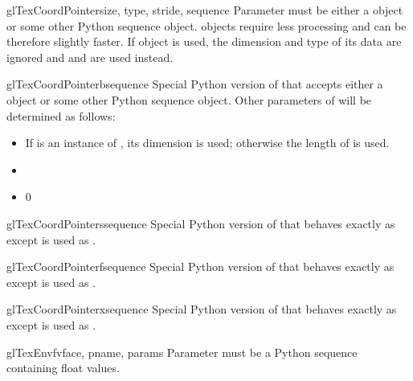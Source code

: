 \begin{funcdesc}{glTexCoordPointer}{size, type, stride, sequence}
Parameter  must be either a  object or some other
Python sequence object.  objects require less processing and
can be therefore slightly faster. If  object is used, the
dimension and type of its data are ignored and  and  are
used instead.
\end{funcdesc}

\begin{funcdesc}{glTexCoordPointerb}{sequence}
Special Python version of  that accepts either a
 object or some other Python sequence object. Other parameters
 of  will be determined as follows:
\begin{itemize}
\item {} If  is an instance of , its dimension is used; otherwise the length of  is used.
\item {} 
\item {} 0
\end{itemize}
\end{funcdesc}

\begin{funcdesc}{glTexCoordPointers}{sequence}
Special Python version of  that behaves exactly as
 except  is used as .
\end{funcdesc}

\begin{funcdesc}{glTexCoordPointerf}{sequence}
Special Python version of  that behaves exactly as
 except  is used as .
\end{funcdesc}

\begin{funcdesc}{glTexCoordPointerx}{sequence}
Special Python version of  that behaves exactly as
 except  is used as .
\end{funcdesc}

\begin{funcdesc}{glTexEnvfv}{face, pname, params}
Parameter  must be a Python sequence containing float values.
\end{funcdesc}

